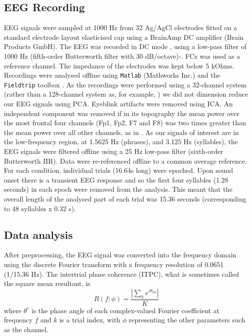 \documentclass[10pt,letterpaper]{article}
\newcommand{\citet}[1]{\cite{#1}}
\begin{document}
\subsection*{EEG Recording}
 
EEG signals were sampled at 1000 Hz from 32 Ag/AgCl electrodes fitted
on a standard electrode layout elasticised cap using a BrainAmp DC
amplifier (Brain Products GmbH). The EEG was recorded in DC mode ,
using a low-pass filter of 1000 Hz (fifth-order Butterworth filter
with 30 dB/octave)-. FCz was used as a reference channel. The
impedance of the electrodes was kept below 5 kOhms. Recordings were
analysed offline using \texttt{Matlab} (Mathworks Inc.) and the
\texttt{Fieldtrip} toolbox \cite{FieldTrip}. As the recordings were
performed using a 32-channel system (rather than a 128-channel system
as, for example, \citet{DingEtAl2017}) we did not dimension reduce our
EEG signals using PCA. Eyeblink artifacts were removed using ICA. An
independent component was removed if in its topography the mean power
over the most frontal four channels (Fp1, Fp2, F7 and F8) was two
times greater than the mean power over all other channels, as in
\citet{DingEtAl2017}. As our signals of interest are in the
low-frequency region, at 1.5625 Hz (phrases), and 3.125 Hz
(syllables), the EEG signals were filtered offline using a 25 Hz
low-pass filter (sixth-order Butterworth IIR). Data were re-referenced
offline to a common average reference. For each condition, individual
trials (16.64s long) were epoched. Upon sound onset there is a
transient EEG response and so the first four syllables (1.28 seconds)
in each epoch were removed from the analysis. This meant that the
overall length of the analysed part of each trial was 15.36 seconds
(corresponding to 48 syllables x 0.32 s).

\subsection*{Data analysis}

After preprocessing, the EEG signal was converted into the frequency
domain using the discrete Fourier transform with a frequency
resolution of 0.0651 (1/15.36 Hz). The intertrial phase coherence
(ITPC), what is sometimes called the square mean resultant, is
\begin{equation}
\label{eq:itpc}
R(f;\phi)=\frac{\left|\sum_k e^{i\theta_{k\phi}}\right|}{K}
\end{equation}
where $\theta^c$ is the phase angle of each complex-valued Fourier
coefficient at frequency $f$ and $k$ is a trial index, with $\phi$
representing the other parameters such as the channel.
\end{document}
